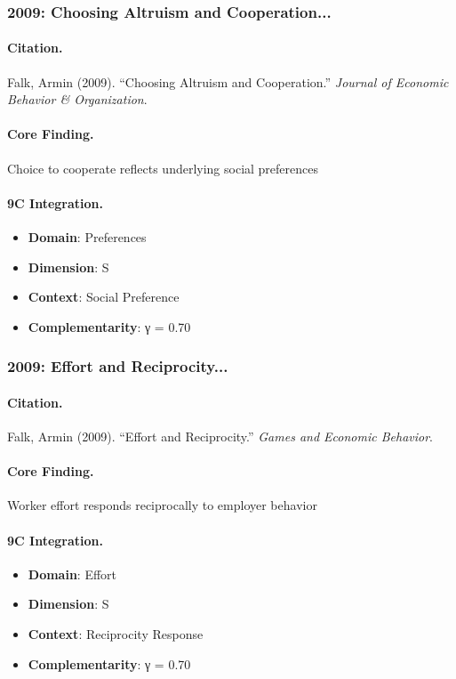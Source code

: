 \subsubsection{2009: Choosing Altruism and Cooperation...}

\paragraph{Citation.}
Falk, Armin (2009). ``Choosing Altruism and Cooperation.''
\textit{Journal of Economic Behavior & Organization}.

\paragraph{Core Finding.}
Choice to cooperate reflects underlying social preferences

\paragraph{9C Integration.}
\begin{itemize}[nosep]
  \item \textbf{Domain}: Preferences
  \item \textbf{Dimension}: S
  \item \textbf{Context}: Social Preference
  \item \textbf{Complementarity}: γ = 0.70
\end{itemize}


\subsubsection{2009: Effort and Reciprocity...}

\paragraph{Citation.}
Falk, Armin (2009). ``Effort and Reciprocity.''
\textit{Games and Economic Behavior}.

\paragraph{Core Finding.}
Worker effort responds reciprocally to employer behavior

\paragraph{9C Integration.}
\begin{itemize}[nosep]
  \item \textbf{Domain}: Effort
  \item \textbf{Dimension}: S
  \item \textbf{Context}: Reciprocity Response
  \item \textbf{Complementarity}: γ = 0.70
\end{itemize}


